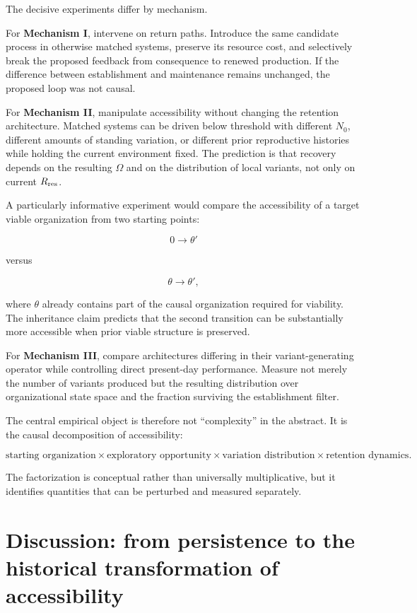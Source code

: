 \documentclass[11pt,a4paper]{article}
\begin{document}
The decisive experiments differ by mechanism.

For \textbf{Mechanism I}, intervene on return paths. Introduce the same
candidate process in otherwise matched systems, preserve its resource
cost, and selectively break the proposed feedback from consequence to
renewed production. If the difference between establishment and
maintenance remains unchanged, the proposed loop was not causal.

For \textbf{Mechanism II}, manipulate accessibility without changing the
retention architecture. Matched systems can be driven below threshold
with different \(N_0\), different amounts of standing variation, or
different prior reproductive histories while holding the current
environment fixed. The prediction is that recovery depends on the
resulting \(\Omega\) and on the distribution of local variants, not only
on current \(R_{\rm res}\).

A particularly informative experiment would compare the accessibility of
a target viable organization from two starting points:

\[
0\longrightarrow\theta'
\]

versus

\[
\theta\longrightarrow\theta',
\]

where \(\theta\) already contains part of the causal organization
required for viability. The inheritance claim predicts that the second
transition can be substantially more accessible when prior viable
structure is preserved.

For \textbf{Mechanism III}, compare architectures differing in their
variant-generating operator while controlling direct present-day
performance. Measure not merely the number of variants produced but the
resulting distribution over organizational state space and the fraction
surviving the establishment filter.

The central empirical object is therefore not ``complexity'' in the
abstract. It is the causal decomposition of accessibility:

\[
\boxed{
\text{starting organization}
\times
\text{exploratory opportunity}
\times
\text{variation distribution}
\times
\text{retention dynamics}.
}
\]

The factorization is conceptual rather than universally multiplicative,
but it identifies quantities that can be perturbed and measured
separately.

\section{Discussion: from persistence to the historical transformation
of
accessibility}\label{discussion-from-persistence-to-the-historical-transformation-of-accessibility}
\end{document}

